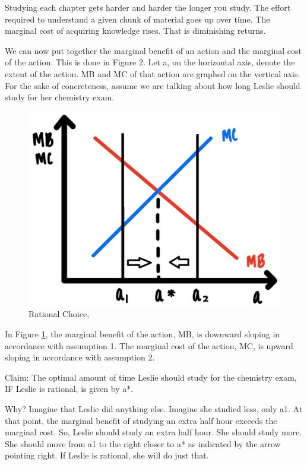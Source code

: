 \documentclass[
]{book}
\begin{document}
Studying each chapter gets harder and harder the longer you study. The effort required to understand a given chunk of material goes up over time. The marginal cost of acquiring knowledge rises. That is diminishing returns.

We can now put together the marginal benefit of an action and the marginal cost of the action. This is done in Figure 2. Let a, on the horizontal axis, denote the extent of the action. MB and MC of that action are graphed on the vertical axis. For the sake of concreteness, assume we are talking about how long Leslie should study for her chemistry exam.

\begin{figure}

{\centering \includegraphics[width=0.75\linewidth]{img/rationalchoice/fig2} 

}

\caption{Rational Choice,}\label{fig:rationalchoice02}
\end{figure}

In Figure \ref{fig:rationalchoice02}, the marginal benefit of the action, MB, is downward sloping in accordance with assumption 1. The marginal cost of the action, MC, is upward sloping in accordance with assumption 2.

Claim: The optimal amount of time Leslie should study for the chemistry exam, IF Leslie is rational, is given by a*.

Why? Imagine that Leslie did anything else. Imagine she studied less, only a1. At that point, the marginal benefit of studying an extra half hour exceeds the marginal cost. So, Leslie should study an extra half hour. She should study more. She should move from a1 to the right closer to a* as indicated by the arrow pointing right. If Leslie is rational, she will do just that.
\end{document}
